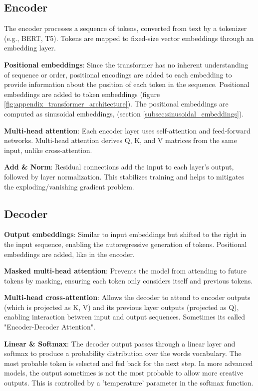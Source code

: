 \subsection*{Encoder}

The encoder processes a sequence of tokens, converted from text by a tokenizer (e.g., BERT, T5). Tokens are mapped to fixed-size vector embeddings through an embedding layer.

\textbf{Positional embeddings}: Since the transformer has no inherent understanding of sequence or order, positional encodings are added to each embedding to provide information about the position of each token in the sequence. Positional embeddings are added to token embeddings (figure \ref{fig:appendix_transformer_architecture}). The positional embeddings are computed as sinusoidal embeddings, (section \ref{subsec:sinusoidal_embeddings}).

\textbf{Multi-head attention}: Each encoder layer uses self-attention and feed-forward networks. Multi-head attention derives Q, K, and V matrices from the same input, unlike cross-attention.

\textbf{Add \& Norm}: Residual connections add the input to each layer's output, followed by layer normalization. This stabilizes training and helps to mitigates the exploding/vanishing gradient problem.









\subsection*{Decoder}

\textbf{Output embeddings}: Similar to input embeddings but shifted to the right in the input sequence, enabling the autoregressive generation of tokens. Positional embeddings are added, like in the encoder.

\textbf{Masked multi-head attention}: Prevents the model from attending to future tokens by masking, ensuring each token only considers itself and previous tokens.

\textbf{Multi-head cross-attention}: Allows the decoder to attend to encoder outputs (which is projected as K, V) and its previous layer outputs (projected as Q), enabling interaction between input and output sequences. Sometimes its called "Encoder-Decoder Attention".

\textbf{Linear \& Softmax}: The decoder output passes through a linear layer and softmax to produce a probability distribution over the words vocabulary. The most probable token is selected and fed back for the next step. In more advanced models, the output sometimes is not the most probable to allow more creative outputs. This is controlled by a 'temperature' parameter in the softmax function.

